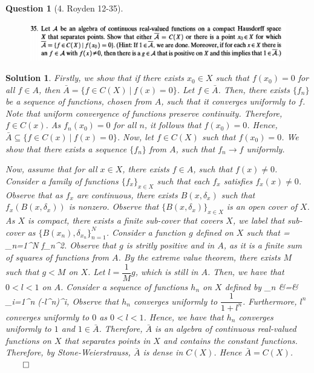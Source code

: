 \documentclass{article} %
\def\eQb#1\eQe{\begin{eqnarray*}#1\end{eqnarray*}}
\theoremstyle{quest}
\newtheorem*{question}{Question}
\newtheorem*{solution}{Solution}
\begin{document}
\newpage

\begin{question}[4. Royden 12-35]
\hfill
\begin{figure}[h!]
  \centering
    \includegraphics[width=1\textwidth]{12-35}
\end{figure}
\end{question}
\begin{solution}
Firstly, we show that if there exists $x_0 \in X$ such that 
$f(x_0) = 0$ for all $f \in A$, then $\bar{A} = \{ f \in C(X) \> | \> 
f(x) = 0 \}$. Let $f \in \bar{A}$.
Then, there exists $\{ f_n \}$ be a sequence of functions, chosen
from $A$, such that it converges uniformly to $f$. Note that
uniform convergence of functions preserve continuity. Therefore, 
$f \in C(x)$. As $f_n(x_0) = 0$
for all $n$, it follows that $f(x_0) = 0$. Hence, $\bar{A} \subseteq
\{ f \in C(x) \> | \> f(x) = 0\}$. Now, let $f \in C(X)$ such that
$f(x_0) = 0$. We show that there exists a sequence $\{ f_n \}$ from $A$,
such that $f_n \to f$ uniformly.  

\smallskip

Now, assume that for all $x \in X$, there exists $f \in A$, such that
$f(x) \neq 0$. Consider a family of functions $\{ f_x\}_{x \in X}$
such that each $f_x$ satisfies $f_x(x) \neq 0$. Observe that as $f_x$
are continuous, there exists $B(x,\delta_x )$ such that $f_x(B(x,\delta_x))$
is nonzero. Observe that $\{ B(x,\delta_x) \}_{x\in X}$ is an open 
cover of $X$. As $X$ is compact, there exists a finite sub-cover 
that covers $X$, we label that sub-cover as 
$\{ B(x_n),\delta_{x_n} \}_{n=1}^{N}$. Consider a function $g$ defined 
on $X$ such that 
\eQb
g = \sum_{n=1}^{N} f_n^2. 
\eQe
Observe that $g$ is stritly positive and in $A$, as it is a finite sum
of squares of functions from $A$. By the extreme value theorem, 
there exists $M$ such that $g < M$ on $X$. Let $l = \dfrac{1}{M}g$, which
is still in $A$. Then, we have that $0 < l < 1$ on $A$. Consider a 
sequence of functions $h_n$ on $X$ defined by 
\eQb
h_n &=& \sum_{i=1}^{n} (-l^n)^i,
\eQe 
Observe that $h_n$ converges uniformly to $\dfrac{1}{1+l^n}$. Furthermore,
$l^n$ converges uniformly to $0$ as $0 < l < 1$. Hence, we have that
$h_n$ converges uniformly to $1$ and $1 \in \bar{A}$. Therefore,
$\bar{A}$ is an algebra of continuous real-valued functions on $X$
that separates points in $X$ and contains the constant functions. Therefore,
by Stone-Weierstrauss, 
$\bar{A}$ is dense in $C(X)$.  
Hence $\bar{A} = C(X)$. \hfill $\qed$ 


\end{solution}
\end{document}
